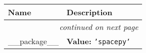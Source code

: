     \vspace{-1cm}
\hspace{\varindent}\begin{longtable}{|p{\varnamewidth}|p{\vardescrwidth}|l}
\cline{1-2}
\cline{1-2} \centering \textbf{Name} & \centering \textbf{Description}& \\
\cline{1-2}
\endhead\cline{1-2}\multicolumn{3}{r}{\small\textit{continued on next page}}\\\endfoot\cline{1-2}
\endlastfoot\raggedright \_\-\_\-p\-a\-c\-k\-a\-g\-e\-\_\-\_\- & \raggedright \textbf{Value:} 
{\tt \texttt{'}\texttt{spacepy}\texttt{'}}&\\
\cline{1-2}
\end{longtable}


